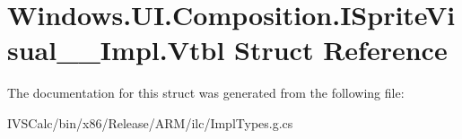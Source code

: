 \hypertarget{struct_windows_1_1_u_i_1_1_composition_1_1_i_sprite_visual_____impl_1_1_vtbl}{}\section{Windows.\+U\+I.\+Composition.\+I\+Sprite\+Visual\+\_\+\+\_\+\+Impl.\+Vtbl Struct Reference}
\label{struct_windows_1_1_u_i_1_1_composition_1_1_i_sprite_visual_____impl_1_1_vtbl}


The documentation for this struct was generated from the following file\+:\begin{DoxyCompactItemize}
\item 
I\+V\+S\+Calc/bin/x86/\+Release/\+A\+R\+M/ilc/Impl\+Types.\+g.\+cs\end{DoxyCompactItemize}
